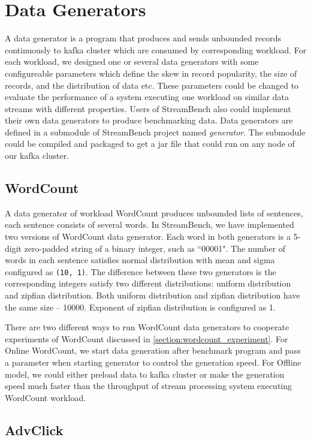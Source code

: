 \section{Data Generators}
\label{section:data_generator}
 A data generator is a program that produces and sends unbounded records continuously to kafka cluster which are consumed by corresponding workload. For each workload, we designed one or several data generators with some configureable parameters which define the skew in record popularity, the size of records, and the distribution of data etc. These parameters could be changed to evaluate the performance of a system executing one workload on similar data streams with different properties. Users of StreamBench also could implement their own data generators to produce benchmarking data. Data generators are defined in a submodule of StreamBench project named \textit{generator}. The submodule could be compiled and packaged to get a jar file that could run on any node of our kafka cluster. 

\subsection{WordCount}
\label{subsection:wordcount_generator}

A data generator of workload WordCount produces unbounded lists of sentences, each sentence consists of several words. In StreamBench, we have implemented two versions of WordCount data generator. Each word in both generators is a 5-digit zero-padded string of a binary integer,  such as ``00001". The number of words in each sentence satisfies normal distribution with mean and sigma configured as \texttt{(10, 1)}. The difference between these two generators is the corresponding integers satisfy two different distributions: uniform distribution and zipfian distribution. Both uniform distribution and zipfian distribution have the same size -- 10000. Exponent of zipfian distribution is configured as 1. 

There are two different ways to run WordCount data generators to cooperate experiments of WordCount discussed in \cref{section:wordcount_experiment}. For Online WordCount, we start data generation after benchmark program and pass a parameter when starting generator to control the generation speed. For Offline model, we could either preload data to kafka cluster or make the generation speed much faster than the throughput of stream processing system executing WordCount workload.

\subsection{AdvClick}
\label{subsection:advclick_generator}

